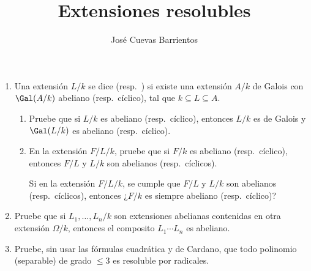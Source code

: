 \documentclass[11pt, reqno]{amsart}
\title{Extensiones resolubles}
\date{\DTMdate{2025-04-03}}
\author{José Cuevas Barrientos}
\begin{document}
\maketitle

\nocite{nagata:fields}
\nocite{lang:algebra}

\begin{enumerate}
	\item Una extensión $L/k$ se dice  (resp.\ ) si existe una extensión
		$A/k$ de Galois con $\Gal(A/k)$ abeliano (resp.\ cíclico), tal que $k \subseteq L \subseteq A$.

		\begin{enumerate}
			\item Pruebe que si $L/k$ es abeliano (resp.\ cíclico), entonces $L/k$ es de Galois y
				$\Gal(L/k)$ es abeliano (resp.\ cíclico).
			\item En la extensión $F/L/k$, pruebe que si $F/k$ es abeliano (resp.\ cíclico), entonces $F/L$
				y $L/k$ son abelianos (resp.\ cíclicos).

				\begin{prob}
					\lookup
					Si en la extensión $F/L/k$, se cumple que $F/L$ y $L/k$ son abelianos (resp.\
					cíclicos), entonces ¿$F/k$ es siempre abeliano (resp.\ cíclico)?
				\end{prob}
		\end{enumerate}

	\item Pruebe que si $L_1, \dots, L_n / k$ son extensiones abelianas contenidas en otra extensión $\Omega/k$,
		entonces el composito $L_1 \cdots L_n$ es abeliano.

	\item\lookright
		Pruebe, sin usar las fórmulas cuadrática y de Cardano, que todo polinomio (separable) de grado
		$\le 3$ es resoluble por radicales.


\end{enumerate}
\end{document}
